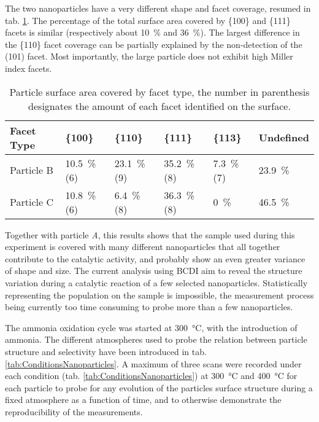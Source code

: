 The two nanoparticles have a very different shape and facet coverage, resumed in tab. \ref{tab:FacetCoverage}.
The percentage of the total surface area covered by \{100\} and \{111\} facets is similar (respectively about \qty{10}{\percent} and \qty{36}{\percent}).
The largest difference in the \{110\} facet coverage can be partially explained by the non-detection of the (101) facet.
Most importantly, the large particle does not exhibit high Miller index facets.

\begin{table}[!htb]
    \centering
    \begin{tabular}{@{}llllll@{}}
    \toprule
    Facet Type & \{100\} & \{110\} & \{111\} & \{113\} & Undefined \\
    \midrule
    Particle B & \qty{10.5}{\percent} (6) & \qty{23.1}{\percent} (9) & \qty{35.2}{\percent} (8) & \qty{7.3}{\percent} (7) & \qty{23.9}{\percent} \\
    Particle C & \qty{10.8}{\percent} (6) &  \qty{6.4}{\percent} (8) & \qty{36.3}{\percent} (8) & \qty{0}{\percent}       & \qty{46.5}{\percent} \\
    \bottomrule
    \end{tabular}%
    \caption{
        Particle surface area covered by facet type, the number in parenthesis designates the amount of each facet identified on the surface.
    }
    \label{tab:FacetCoverage}
\end{table}

Together with particle \textit{A}, this results shows that the sample used during this experiment is covered with many different nanoparticles that all together contribute to the catalytic activity, and probably show an even greater variance of shape and size.
The current analysis using BCDI aim to reveal the structure variation during a catalytic reaction of a few selected nanoparticles.
Statistically representing the population on the sample is impossible, the measurement process being currently too time consuming to probe more than a few nanoparticles.

The ammonia oxidation cycle was started at \qty{300}{\degreeCelsius}, with the introduction of ammonia.
The different atmospheres used to probe the relation between particle structure and selectivity have been introduced in tab. \ref{tab:ConditionsNanoparticles}.
A maximum of three scans were recorded under each condition (tab. \ref{tab:ConditionsNanoparticles}) at \qty{300}{\degreeCelsius} and \qty{400}{\degreeCelsius} for each particle to probe for any evolution of the particles surface structure during a fixed atmosphere as a function of time, and to otherwise demonstrate the reproducibility of the measurements.

